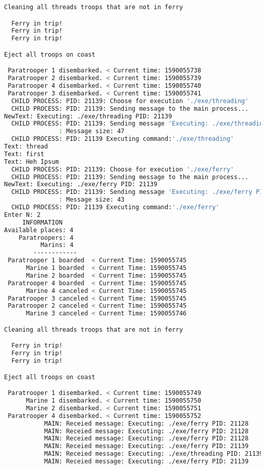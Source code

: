 \documentclass{article}
\begin{document}
\begin{lstlisting}[language=BASH]
Cleaning all threads troops that are not in ferry

  Ferry in trip!
  Ferry in trip!
  Ferry in trip!

Eject all troops on coast

 Paratrooper 1 disembarked. < Current time: 1590055738
 Paratrooper 2 disembarked. < Current time: 1590055739
 Paratrooper 4 disembarked. < Current time: 1590055740
 Paratrooper 3 disembarked. < Current time: 1590055741
  CHILD PROCESS: PID: 21139: Choose for execution './exe/threading'
  CHILD PROCESS: PID: 21139: Sending message to the main process...
NewText: Executing: ./exe/threading PID: 21139
  CHILD PROCESS: PID: 21139: Sending message 'Executing: ./exe/threading PID: 21139' to the MAIN process...
               : Message size: 47
  CHILD PROCESS: PID: 21139 Executing command:'./exe/threading'
Text: thread
Text: first
Text: Heh Ipsum
  CHILD PROCESS: PID: 21139: Choose for execution './exe/ferry'
  CHILD PROCESS: PID: 21139: Sending message to the main process...
NewText: Executing: ./exe/ferry PID: 21139
  CHILD PROCESS: PID: 21139: Sending message 'Executing: ./exe/ferry PID: 21139' to the MAIN process...
               : Message size: 43
  CHILD PROCESS: PID: 21139 Executing command:'./exe/ferry'
Enter N: 2
     INFORMATION
Available places: 4
    Paratroopers: 4
          Marins: 4
        ------------
 Paratrooper 1 boarded  < Current Time: 1590055745 
      Marine 1 boarded  < Current Time: 1590055745 
      Marine 2 boarded  < Current Time: 1590055745 
 Paratrooper 4 boarded  < Current Time: 1590055745 
      Marine 4 canceled < Current Time: 1590055745 
 Paratrooper 3 canceled < Current Time: 1590055745 
 Paratrooper 2 canceled < Current Time: 1590055745 
      Marine 3 canceled < Current Time: 1590055746 

Cleaning all threads troops that are not in ferry

  Ferry in trip!
  Ferry in trip!
  Ferry in trip!

Eject all troops on coast

 Paratrooper 1 disembarked. < Current time: 1590055749
      Marine 1 disembarked. < Current time: 1590055750
      Marine 2 disembarked. < Current time: 1590055751
 Paratrooper 4 disembarked. < Current time: 1590055752
           MAIN: Receied message: Executing: ./exe/ferry PID: 21128
           MAIN: Receied message: Executing: ./exe/ferry PID: 21128
           MAIN: Receied message: Executing: ./exe/ferry PID: 21128
           MAIN: Receied message: Executing: ./exe/ferry PID: 21139
           MAIN: Receied message: Executing: ./exe/threading PID: 21139
           MAIN: Receied message: Executing: ./exe/ferry PID: 21139

\end{lstlisting}
\end{document}
